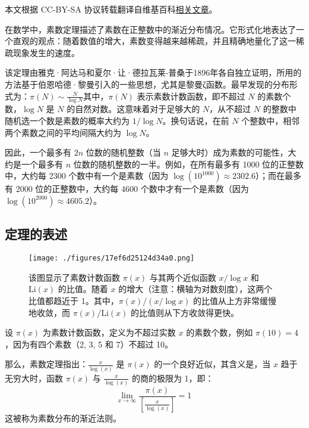 
本文根据 CC-BY-SA 协议转载翻译自维基百科\href{https://en.wikipedia.org/wiki/Prime_number_theorem}{相关文章}。

在数学中，素数定理描述了素数在正整数中的渐近分布情况。它形式化地表达了一个直观的观点：随着数值的增大，素数变得越来越稀疏，并且精确地量化了这一稀疏现象发生的速度。

该定理由雅克·阿达马和夏尔·让·德拉瓦莱-普桑于1896年各自独立证明，所用的方法基于伯恩哈德·黎曼引入的一些思想，尤其是黎曼ζ函数。最早发现的分布形式为：$\pi(N) \sim \frac{N}{\log N}$其中，$\pi(N)$ 表示素数计数函数，即不超过 $N$ 的素数个数，$\log N$ 是 $N$ 的自然对数。这意味着对于足够大的 $N$，从不超过 $N$ 的整数中随机选一个数是素数的概率大约为 $1 / \log N$。换句话说，在前 $N$ 个整数中，相邻两个素数之间的平均间隔大约为 $\log N$。

因此，一个最多有 $2n$ 位数的随机整数（当 $n$ 足够大时）成为素数的可能性，大约是一个最多有 $n$ 位数的随机整数的一半。例如，在所有最多有 1000 位的正整数中，大约每 2300 个数中有一个是素数（因为 $\log(10^{1000}) \approx 2302.6$）；而在最多有 2000 位的正整数中，大约每 4600 个数中才有一个是素数（因为 $\log(10^{2000}) \approx 4605.2$）。
\subsection{定理的表述}
\begin{figure}[ht]
\centering
\texttt{[image: ./figures/17ef6d25124d34a0.png]}
\caption{该图显示了素数计数函数 $\pi(x)$ 与其两个近似函数 $x / \log x$ 和 $\mathrm{Li}(x)$ 的比值。随着 $x$ 的增大（注意：横轴为对数刻度），这两个比值都趋近于 1。其中，$\pi(x) / (x / \log x)$ 的比值从上方非常缓慢地收敛，而 $\pi(x) / \mathrm{Li}(x)$ 的比值则从下方收敛得更快。} \label{fig_SDL_1}
\end{figure}
设 $\pi(x)$ 为素数计数函数，定义为不超过实数 $x$ 的素数个数，例如 $\pi(10) = 4$，因为有四个素数（2, 3, 5 和 7）不超过 10。

那么，素数定理指出：$\frac{x}{\log(x)}$ 是 $\pi(x)$ 的一个良好近似，其含义是，当 $x$ 趋于无穷大时，函数 $\pi(x)$ 与 $\frac{x}{\log(x)}$ 的商的极限为 1，即：
$$
\lim_{x \to \infty} \frac{\pi(x)}{\left[\frac{x}{\log(x)}\right]} = 1~
$$
这被称为素数分布的渐近法则。

